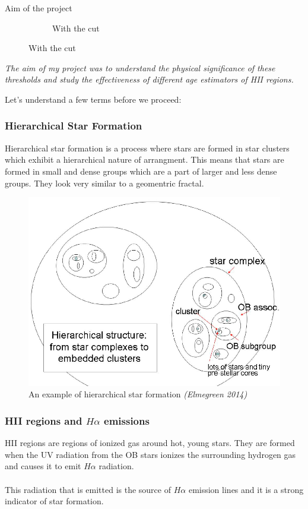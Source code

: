 \documentclass{beamer}
\begin{document}
\begin{frame}{Aim of the project}
\begin{figure}[H]
\begin{subfigure}{0.45\textwidth}
            \caption{With the cut}
            \label{fig:tpcf_with_cut}
        \end{subfigure}
    \end{figure}

    \textit{The aim of my project was to understand the physical significance of these thresholds and study the effectiveness of different age estimators of HII regions.}
\end{frame}

\begin{frame}[standout]
    Let's understand a few terms before we proceed:    
\end{frame}

\begin{frame}
    \frametitle{Hierarchical Star Formation}

    Hierarchical star formation is a process where stars are formed in star clusters which exhibit a hierarchical nature of arrangment. This means that stars are formed in small and dense groups which are a part of larger and less dense groups. They look very similar to a geomentric fractal. 

    \begin{figure}[H]
        \centering
        \includegraphics[scale = 0.27]{hierarchy_stars.png}
        \caption{An example of hierarchical star formation \textit{(Elmegreen 2014)}}
        \label{fig:hierarchy_stars}
    \end{figure}
    
\end{frame}

\begin{frame}
    \frametitle{HII regions and $H\alpha$ emissions}

    HII regions are regions of ionized gas around hot, young stars. They are formed when the UV radiation from the OB stars ionizes the surrounding hydrogen gas and causes it to emit $H\alpha$ radiation. 
    \\~\\
    This radiation that is emitted is the source of $H\alpha$ emission lines and it is a strong indicator of star formation.
\end{frame}
\end{document}
